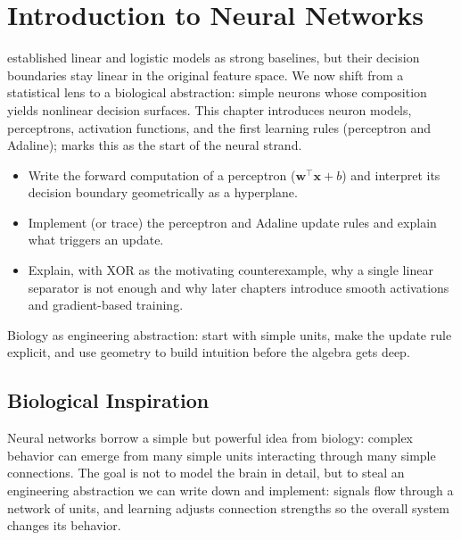\section{Introduction to Neural Networks}\label{chap:perceptron}

 established linear and logistic models as strong baselines, but their decision boundaries stay linear in the original feature space. We now shift from a statistical lens to a biological abstraction: simple neurons whose composition yields nonlinear decision surfaces. This chapter introduces neuron models, perceptrons, activation functions, and the first learning rules (perceptron and Adaline);  marks this as the start of the neural strand.

\begin{tcolorbox}[summarybox, title={Learning Outcomes}]
\begin{itemize}
  \item Write the forward computation of a perceptron (\(\mathbf{w}^\top\mathbf{x}+b\)) and interpret its decision boundary geometrically as a hyperplane.
  \item Implement (or trace) the perceptron and Adaline update rules and explain what triggers an update.
  \item Explain, with XOR as the motivating counterexample, why a single linear separator is not enough and why later chapters introduce smooth activations and gradient-based training.
\end{itemize}
\end{tcolorbox}

\begin{tcolorbox}[summarybox, title={Design motif}]
Biology as engineering abstraction: start with simple units, make the update rule explicit, and use geometry to build intuition before the algebra gets deep.
\end{tcolorbox}

\subsection{Biological Inspiration}
\label{sec:perceptron_biological_inspiration}

Neural networks borrow a simple but powerful idea from biology: complex behavior can emerge from many simple units interacting through many simple connections. The goal is not to model the brain in detail, but to steal an engineering abstraction we can write down and implement: signals flow through a network of units, and learning adjusts connection strengths so the overall system changes its behavior.

